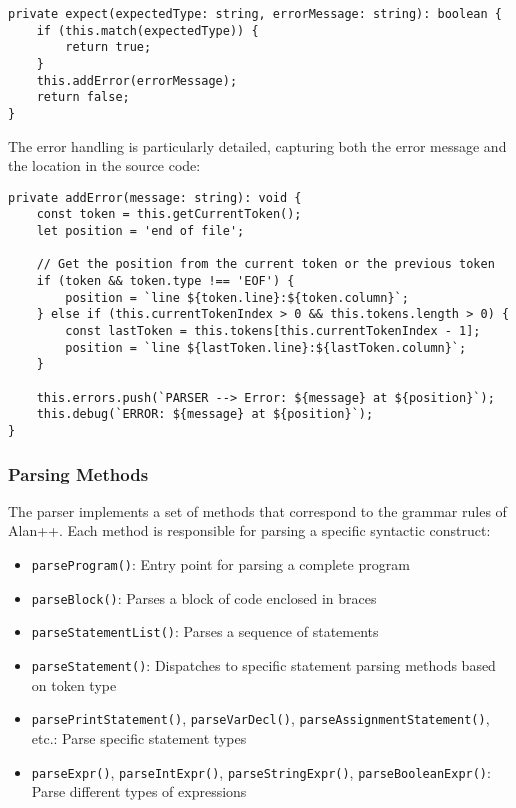 \documentclass[12pt]{article}
\begin{document}
\begin{lstlisting}
private expect(expectedType: string, errorMessage: string): boolean {
    if (this.match(expectedType)) {
        return true;
    }
    this.addError(errorMessage);
    return false;
}
\end{lstlisting}

The error handling is particularly detailed, capturing both the error message and the location in the source code:

\begin{lstlisting}
private addError(message: string): void {
    const token = this.getCurrentToken();
    let position = 'end of file';
    
    // Get the position from the current token or the previous token
    if (token && token.type !== 'EOF') {
        position = `line ${token.line}:${token.column}`;
    } else if (this.currentTokenIndex > 0 && this.tokens.length > 0) {
        const lastToken = this.tokens[this.currentTokenIndex - 1];
        position = `line ${lastToken.line}:${lastToken.column}`;
    }
    
    this.errors.push(`PARSER --> Error: ${message} at ${position}`);
    this.debug(`ERROR: ${message} at ${position}`);
}
\end{lstlisting}

\subsubsection{Parsing Methods}
The parser implements a set of methods that correspond to the grammar rules of Alan++. Each method is responsible for parsing a specific syntactic construct:

\begin{itemize}
    \item \texttt{parseProgram()}: Entry point for parsing a complete program
    \item \texttt{parseBlock()}: Parses a block of code enclosed in braces
    \item \texttt{parseStatementList()}: Parses a sequence of statements
    \item \texttt{parseStatement()}: Dispatches to specific statement parsing methods based on token type
    \item \texttt{parsePrintStatement()}, \texttt{parseVarDecl()}, \texttt{parseAssignmentStatement()}, etc.: Parse specific statement types
    \item \texttt{parseExpr()}, \texttt{parseIntExpr()}, \texttt{parseStringExpr()}, \texttt{parseBooleanExpr()}: Parse different types of expressions
\end{itemize}
\end{document}
